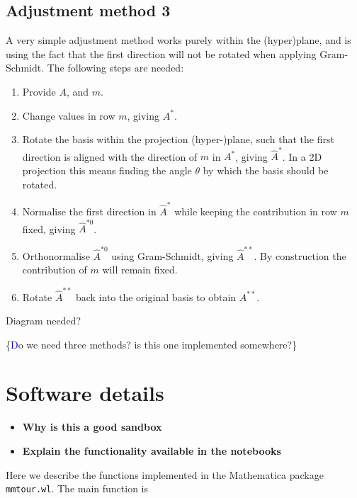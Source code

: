 \documentclass[]{interact}
\theoremstyle{plain}%
\theoremstyle{definition}
\theoremstyle{remark}
\providecommand{\tightlist}{%
  \setlength{\itemsep}{0pt}\setlength{\parskip}{0pt}}
\def\tightlist{}
\begin{document}
\hypertarget{adjustment-method-3}{%
\subsection{Adjustment method 3}\label{adjustment-method-3}}

A very simple adjustment method works purely within the (hyper)plane,
and is using the fact that the first direction will not be rotated when
applying Gram-Schmidt. The following steps are needed:

\begin{enumerate}
\def\labelenumi{\arabic{enumi}.}
\tightlist
\item
  Provide \(A\), and \(m\).
\item
  Change values in row \(m\), giving \(A^*\).
\item
  Rotate the basis within the projection (hyper-)plane, such that the
  first direction is aligned with the direction of \(m\) in \(A^*\),
  giving \(\hat A^*\). In a 2D projection this means finding the angle
  \(\theta\) by which the basis should be rotated.
\item
  Normalise the first direction in \(\hat A^*\) while keeping the
  contribution in row \(m\) fixed, giving \(\hat A^{*0}\).
\item
  Orthonormalise \(\hat A^{*0}\) using Gram-Schmidt, giving
  \(\hat A^{**}\). By construction the contribution of \(m\) will remain
  fixed.
\item
  Rotate \(\hat A^{**}\) back into the original basis to obtain
  \(A^{**}\).
\end{enumerate}

Diagram needed?

\{\textcolor{blue} Do we need three methods? is this one implemented
somewhere?\}

\hypertarget{software-details}{%
\section{Software details}\label{software-details}}

\begin{itemize}
\tightlist
\item
  \textbf{Why is this a good sandbox}
\item
  \textbf{Explain the functionality available in the notebooks}
\end{itemize}

Here we describe the functions implemented in the Mathematica package
\texttt{mmtour.wl}. The main function is
\end{document}
